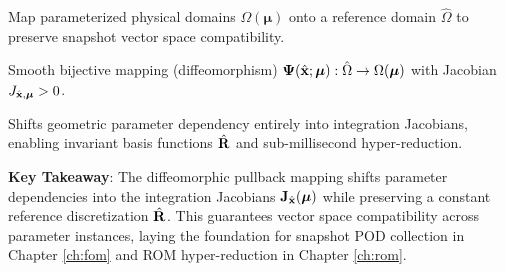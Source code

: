 \begin{tcolorbox}[colback=lightbg, colframe=primaryblue, title=\textbf{Chapter Summary: Reference Diffeomorphic Mapping}, fonttitle=\bfseries]
    \begin{description}[leftmargin=!, labelwidth=3.4cm]
        \item[\textbf{Core Objective}] Map parameterized physical domains $\Omega(\boldsymbol{\mu})$ onto a reference domain $\hat{\Omega}$ to preserve snapshot vector space compatibility.
        \item[\textbf{Mathematical Tool}] Smooth bijective mapping (diffeomorphism) $\boldsymbol{\Psi}(\hat{\mathbf{x}}; \boldsymbol{\mu}): \hat{\Omega} \to \Omega(\boldsymbol{\mu})$ with Jacobian $J_{\hat{\mathbf{x}}, \boldsymbol{\mu}} > 0$.
        \item[\textbf{Key Result}] Shifts geometric parameter dependency entirely into integration Jacobians, enabling invariant basis functions $\hat{\mathbf{R}}$ and sub-millisecond hyper-reduction.
    \end{description}
    
    \vspace{0.2cm}
    \textbf{Key Takeaway}: The diffeomorphic pullback mapping shifts parameter dependencies into the integration Jacobians $\mathbf{J}_{\hat{\mathbf{x}}}(\boldsymbol{\mu})$ while preserving a constant reference discretization $\hat{\mathbf{R}}$. This guarantees vector space compatibility across parameter instances, laying the foundation for snapshot POD collection in Chapter \ref{ch:fom} and ROM hyper-reduction in Chapter \ref{ch:rom}.
\end{tcolorbox}
